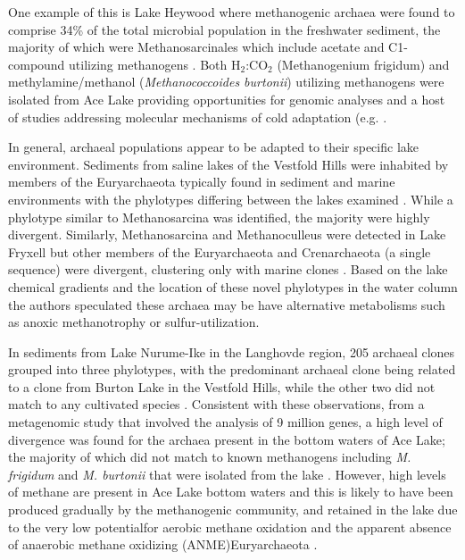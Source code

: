 One example of this is Lake Heywood where methanogenic archaea were found to comprise 34\% of the total microbial population in the freshwater sediment, 
the majority of which were Methanosarcinales which include acetate and C1-compound utilizing methanogens \cite{Purdy2003}. 
Both H$_2$:CO$_2$ (Methanogenium frigidum) and methylamine/methanol (\textit{Methanococcoides burtonii}) utilizing methanogens were isolated from Ace Lake 
\cite{Franzmann1992, Franmann1997} providing opportunities for genomic analyses \cite{Saunders2003, Allen2009} and a host of studies addressing molecular mechanisms of cold adaptation 
(e.g. \cite{Cavicchioli2006, Williams2011}.

In general, archaeal populations appear to be adapted to their specific lake environment.
Sediments from saline lakes of the Vestfold Hills were inhabited by members of the Euryarchaeota typically found in sediment and marine environments 
with the phylotypes differing between the lakes examined \cite{Bowman2000a}. 
While a phylotype similar to Methanosarcina was identified, the majority were highly divergent. 
Similarly, Methanosarcina and Methanoculleus were detected in Lake Fryxell but other members of the Euryarchaeota and Crenarchaeota (a single sequence) were divergent, 
clustering only with marine clones \cite{Karr2006}. 
Based on the lake chemical gradients and the location of these novel phylotypes in the water column 
the authors speculated these archaea may be have alternative metabolisms such as anoxic methanotrophy or sulfur-utilization. 

In sediments from Lake Nurume-Ike in the Langhovde region, 205 archaeal clones grouped into three phylotypes, 
with the predominant archaeal clone being related to a clone from Burton Lake in the Vestfold Hills, while the other two did not match to any cultivated species \cite{Kurasawa2010}. 
Consistent with these observations, from a metagenomic study that involved the analysis of 9 million genes, a high level of divergence was found for the archaea present in the bottom waters of Ace Lake; 
the majority of which did not match to known methanogens including \textit{M. frigidum} and \textit{M. burtonii} that were isolated from the lake \cite{Lauro2011}. 
However, high levels of methane are present in Ace Lake bottom waters and this is likely to have been produced gradually by the methanogenic community, 
and retained in the lake due to the very low potentialfor aerobic methane oxidation and the apparent absence of anaerobic methane oxidizing (ANME)Euryarchaeota \cite{Lauro2011}.

